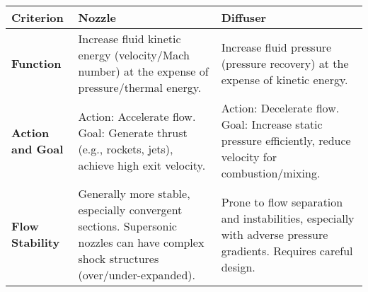 \begin{longtable}[]{@{}lll@{}}
\toprule
\begin{minipage}[b]{0.12\columnwidth}\raggedright
Criterion\strut
\end{minipage} & \begin{minipage}[b]{0.39\columnwidth}\raggedright
Nozzle\strut
\end{minipage} & \begin{minipage}[b]{0.41\columnwidth}\raggedright
Diffuser\strut
\end{minipage}\tabularnewline
\midrule
\endhead
\begin{minipage}[t]{0.12\columnwidth}\raggedright
\textbf{Function}\strut
\end{minipage} & \begin{minipage}[t]{0.39\columnwidth}\raggedright
Increase fluid kinetic energy (velocity/Mach number) at the expense of
pressure/thermal energy.\strut
\end{minipage} & \begin{minipage}[t]{0.41\columnwidth}\raggedright
Increase fluid pressure (pressure recovery) at the expense of kinetic
energy.\strut
\end{minipage}\tabularnewline
\begin{minipage}[t]{0.12\columnwidth}\raggedright
\textbf{Action and Goal}\strut
\end{minipage} & \begin{minipage}[t]{0.39\columnwidth}\raggedright
Action: Accelerate flow. Goal: Generate thrust (e.g., rockets, jets),
achieve high exit velocity.\strut
\end{minipage} & \begin{minipage}[t]{0.41\columnwidth}\raggedright
Action: Decelerate flow. Goal: Increase static pressure efficiently,
reduce velocity for combustion/mixing.\strut
\end{minipage}\tabularnewline
\begin{minipage}[t]{0.12\columnwidth}\raggedright
\textbf{Flow Stability}\strut
\end{minipage} & \begin{minipage}[t]{0.39\columnwidth}\raggedright
Generally more stable, especially convergent sections. Supersonic
nozzles can have complex shock structures (over/under-expanded).\strut
\end{minipage} & \begin{minipage}[t]{0.41\columnwidth}\raggedright
Prone to flow separation and instabilities, especially with adverse
pressure gradients. Requires careful design.\strut

\end{minipage}
\end{longtable}
